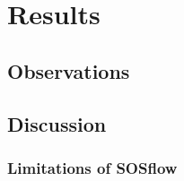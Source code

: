 
\section{Results} %
\subsection{Observations}
%
%
\subsection{Discussion}
%
%
\subsubsection{Limitations of SOSflow}
%
%



